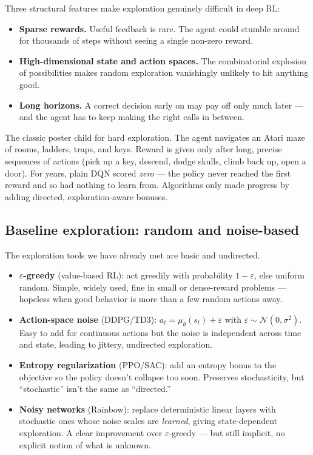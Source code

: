 \documentclass[11pt, oneside]{book}
\newcommand{\Normal}{\mathcal{N}}
\begin{document}
Three structural features make exploration genuinely difficult in deep RL:
\begin{itemize}
  \item \textbf{Sparse rewards.} Useful feedback is rare. The agent could stumble around
    for thousands of steps without seeing a single non-zero reward.
  \item \textbf{High-dimensional state and action spaces.} The combinatorial explosion of
    possibilities makes random exploration vanishingly unlikely to hit anything good.
  \item \textbf{Long horizons.} A correct decision early on may pay off only much later
    --- and the agent has to keep making the right calls in between.
\end{itemize}

\begin{exbox}[title={Montezuma's Revenge}]
The classic poster child for hard exploration. The agent navigates an Atari maze of
rooms, ladders, traps, and keys. Reward is given only after long, precise sequences
of actions (pick up a key, descend, dodge skulls, climb back up, open a door).
For years, plain DQN scored \emph{zero} --- the policy never reached the first
reward and so had nothing to learn from.
Algorithms only made progress by adding directed, exploration-aware bonuses.
\end{exbox}

\subsection{Baseline exploration: random and noise-based}

The exploration tools we have already met are basic and undirected.
\begin{itemize}
  \item \textbf{$\varepsilon$-greedy} (value-based RL): act greedily with probability
    $1 - \varepsilon$, else uniform random.
    Simple, widely used, fine in small or dense-reward problems --- hopeless when good
    behavior is more than a few random actions away.
  \item \textbf{Action-space noise} (DDPG/TD3): $a_t = \mu_\theta(s_t) + \varepsilon$
    with $\varepsilon \sim \Normal(0, \sigma^2)$.
    Easy to add for continuous actions but the noise is independent across time and
    state, leading to jittery, undirected exploration.
  \item \textbf{Entropy regularization} (PPO/SAC): add an entropy bonus to the objective
    so the policy doesn't collapse too soon.
    Preserves stochasticity, but ``stochastic'' isn't the same as ``directed.''
  \item \textbf{Noisy networks} (Rainbow): replace deterministic linear layers with
    stochastic ones whose noise scales are \emph{learned}, giving state-dependent
    exploration. A clear improvement over $\varepsilon$-greedy --- but still implicit,
    no explicit notion of what is unknown.
\end{itemize}
\end{document}
